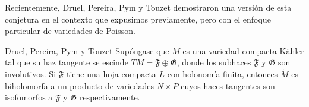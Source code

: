 \documentclass[letterpaper]{beamer}
\newcommand{\co}{\ensuremath{\mathbb C }}
\begin{document}
\begin{frame}
Recientemente, Druel, Pereira, Pym y Touzet demostraron una versi\'on de esta conjetura en el contexto que expusimos previamente,
pero con el enfoque particular de variedades de Poisson.
\begin{block}{Druel, Pereira, Pym y Touzet}\label{DPPT}
        Sup\'ongase que $M$ es una variedad compacta K\"ahler tal que su haz tangente se escinde $TM=\mathfrak{F}\oplus\mathfrak{G}$, donde
        los subhaces $\mathfrak{F}$ y $\mathfrak{G}$ son involutivos. Si $\mathfrak{F}$ tiene una hoja compacta $L$ con holonom\'ia finita,
        entonces $\widetilde{M}$ es biholomorfa a un producto de variedades $N\times P$ cuyos haces tangentes son isofomorfos
        a $\mathfrak{F}$ y $\mathfrak{G}$ respectivamente.
\end{block}
\end{frame}
\end{document}
